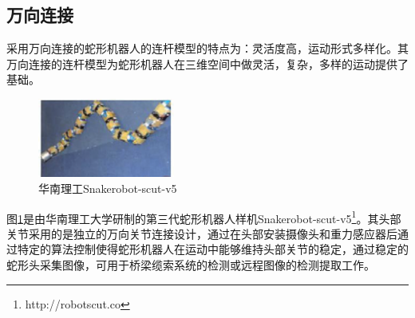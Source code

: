 \subsection{万向连接}
采用万向连接的蛇形机器人的连杆模型的特点为：灵活度高，运动形式多样化。其万向连接的连杆模型为蛇形机器人在三维空间中做灵活，复杂，多样的运动提供了基础。
\begin{figure}
	\centering
	\includegraphics[width=0.4\textwidth]{figure/chap03/scut.eps}
	\caption{华南理工Snakerobot-scut-v5}
	\label{fig:scut}
\end{figure}图\ref{fig:scut}是由华南理工大学研制的第三代蛇形机器人样机Snakerobot-scut-v5\footnote{http://robotscut.co}。其头部关节采用的是独立的万向关节连接设计，通过在头部安装摄像头和重力感应器后通过特定的算法控制使得蛇形机器人在运动中能够维持头部关节的稳定，通过稳定的蛇形头采集图像，可用于桥梁缆索系统的检测或远程图像的检测提取工作。

